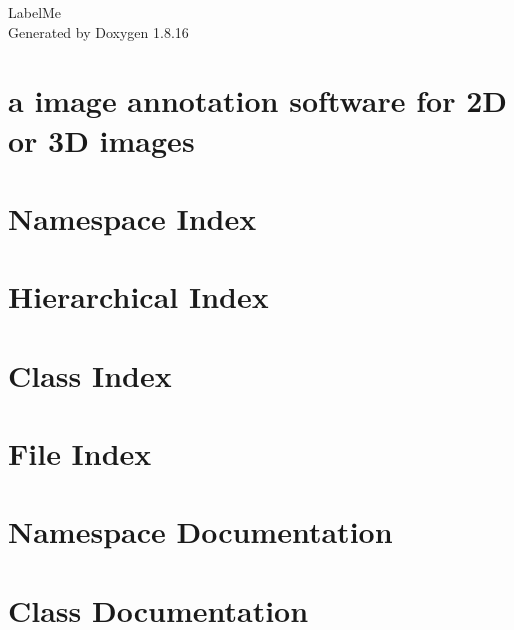 \let\mypdfximage\pdfximage\def\pdfximage{\immediate\mypdfximage}\documentclass[twoside]{book}
\newcommand{\+}{\discretionary{\mbox{\scriptsize$\hookleftarrow$}}{}{}}
\newcommand{\clearemptydoublepage}{%
  \newpage{\pagestyle{empty}\cleardoublepage}%
}
\begin{document}
\hypersetup{pageanchor=false,
             bookmarksnumbered=true,
             pdfencoding=unicode
            }
\begin{titlepage}
\vspace*{7cm}
\begin{center}%
{\Large Label\+Me }\\
\vspace*{1cm}
{\large Generated by Doxygen 1.8.16}\\
\end{center}
\end{titlepage}
\clearemptydoublepage
{}
\tableofcontents
\clearemptydoublepage
{}
\hypersetup{pageanchor=true}

\chapter{a image annotation software for 2D or 3D images}
\label{index}\hypertarget{index}{}
\chapter{Namespace Index}

\chapter{Hierarchical Index}

\chapter{Class Index}

\chapter{File Index}

\chapter{Namespace Documentation}

\chapter{Class Documentation}


























\end{document}
